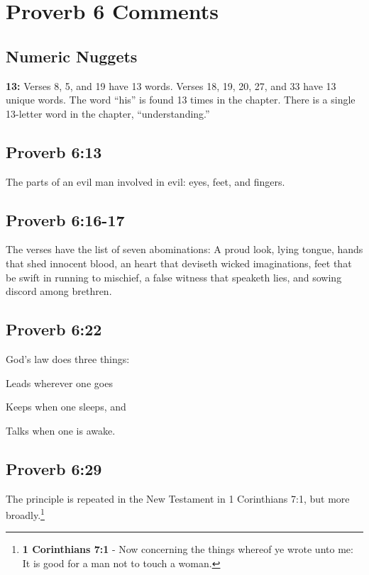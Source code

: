 \section{Proverb 6 Comments}

\subsection{Numeric Nuggets}
\textbf{13:} Verses 8, 5, and 19 have 13 words. Verses 18, 19, 20, 27, and 33 have 13 unique words. The word ``his'' is found 13 times in the chapter. There is a single 13-letter word in the chapter, ``understanding.''

\subsection{Proverb 6:13}
The parts of an evil man involved in evil: eyes, feet, and fingers.

\subsection{Proverb 6:16-17}
The verses have the list of seven abominations: A proud look, lying tongue, hands that shed innocent blood, an heart that deviseth wicked imaginations, feet that be swift in running to mischief, a false witness that speaketh lies, and sowing discord among brethren.


\subsection{Proverb 6:22}
God's law does three things:
\begin{compactenum}[1.]
    \item Leads wherever one goes
    \item Keeps when one sleeps, and
    \item Talks when one is awake.
\end{compactenum}

\subsection{Proverb 6:29}
The principle is repeated in the New Testament in 1 Corinthians 7:1, but more broadly.\footnote{\textbf{1 Corinthians 7:1} - Now concerning the things whereof ye wrote unto me: It is good for a man not to touch a woman.}

